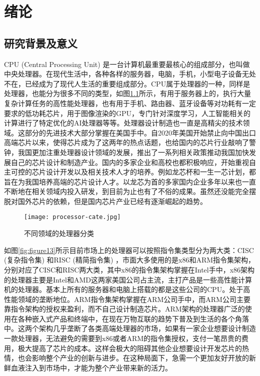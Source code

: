 
\chapter{绪论}

\section{研究背景及意义}
CPU (Central Processing Unit) 是一台计算机最重要最核心的组成部分，也叫做中央处理器。在现代生活中，各种各样的服务器，电脑，手机，小型电子设备无处不在，已经成为了现代人生活的重要组成部分。CPU属于处理器的一种，同样是处理器，也能分为很多不同的类型，如图\ref{fig:figure14}所示，有用于服务器上的，执行大量复杂计算任务的高性能处理器，也有用于手机、路由器、蓝牙设备等对功耗有一定要求的低功耗芯片，用于图像渲染的GPU，专门针对深度学习，人工智能相关的计算进行了特定优化的AI处理器等等。处理器设计制造也一直是高精尖的技术领域。这部分的先进技术大部分掌握在美国手中。自2020年美国开始禁止向中国出口高端芯片以来，使得芯片成为了这两年的热点话题，也给国内的芯片行业敲响了警钟，我国更加注重处理器设计领域的发展，推出了一系列相关政策推动我国加快发展自己的芯片设计和制造产业。国内的多家企业和高校也都积极响应，开始重视自主可控的芯片设计开发以及相关技术人才的培养。例如龙芯杯和一生一芯计划\cite{ysyx}，都旨在为我国培养高端的芯片设计人才。以龙芯为首的多家国内企业多年以来也一直不断地在相关领域内投入研发，到目前为止也有了不俗的成果。虽然还没能完全摆脱对国外芯片的依赖，但是国内芯片产业已经有逐渐崛起的趋势。

\begin{figure}[htb]
    \centering
    \setlength\tabcolsep{3pt}  %
    \vspace{5pt} %
    \texttt{[image: processor-cate.jpg]}
    \caption{不同领域的处理器分类\cite{cpu-overview}}
    \label{fig:figure14}
\end{figure}

如图\ref{fig:figure13}所示目前市场上的处理器可以按照指令集类型分为两大类：CISC (复杂指令集) 和RISC (精简指令集) \cite{cpu-overview}，市面大多使用的是x86和ARM指令集架构，分别对应了CISC和RISC两大类，其中x86的指令集架构掌握在Intel手中，x86架构的处理器主要是Intel和AMD这两家美国公司占主流，主打产品是一些高性能计算机的处理器。基本上所有的服务器和电脑上搭载的都是这些公司的CPU。处于高性能领域的垄断地位。ARM指令集架构掌握在ARM公司手中，而ARM公司主要靠指令架构的授权来盈利，而不自己设计制造芯片。ARM架构的处理器广泛的使用在各种嵌入式产品和终端中，在现在万物互联的趋势下普及到生活的各个角落中。这两个架构几乎垄断了各类高端处理器的市场，如果有一家企业想要设计制造一款处理器，无法避免的需要到x86或者ARM的指令集授权，支付一笔昂贵的费用，极大提高了芯片的成本。这样会极大的阻碍其他企业想要设计开发芯片的热情，也会影响整个产业的创新与进步。在这种局面下，急需一个更加友好开放的新鲜血液注入到市场中，才能为整个产业带来新的活力。

